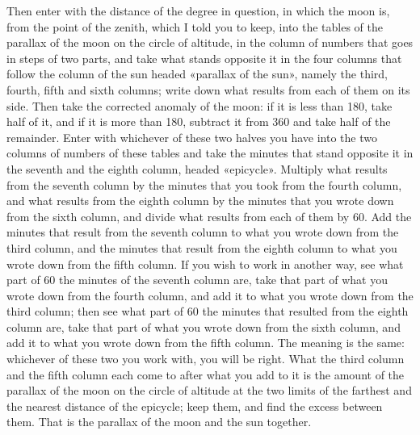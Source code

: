 \documentclass[11pt]{article}
\newcommand{\ArPage}[1]{\marginpar{\footnotesize\color{gray}Ar.\,p.\,#1}}
\begin{document}
\par \ArPage{120}Then enter with the distance of the degree in question, in which the moon is, from the point of the zenith, which I told you to keep, into the tables of the parallax of the moon on the circle of altitude, in the column of numbers that goes in steps of two parts, and take what stands opposite it in the four columns that follow the column of the sun headed «parallax of the sun», namely the third, fourth, fifth and sixth columns; write down what results from each of them on its side. Then take the corrected anomaly of the moon: if it is less than 180, take half of it, and if it is more than 180, subtract it from 360 and take half of the remainder. Enter with whichever of these two halves you have into the two columns of numbers of these tables and take the minutes that stand opposite it in the seventh and the eighth column, headed «epicycle». Multiply what results from the seventh column by the minutes that you took from the fourth column, and what results from the eighth column by the minutes that you wrote down from the sixth column, and divide what results from each of them by 60. Add the minutes that result from the seventh column to what you wrote down from the third column, and the minutes that result from the eighth column to what you wrote down from the fifth column. If you wish to work in another way, see what part of 60 the minutes of the seventh column are, take that part of what you wrote down from the fourth column, and add it to what you wrote down from the third column; then see what part of 60 the minutes that resulted from the eighth column are, take that part of what you wrote down from the sixth column, and add it to what you wrote down from the fifth column. The meaning is the same: whichever of these two you work with, you will be right. What the third column and the fifth column each come to after what you add to it is the amount of the parallax of the moon on the circle of altitude at the two limits of the farthest and the nearest distance of the epicycle; keep them, and find the excess between them. That is the parallax of the moon and the sun together.\par
\end{document}
